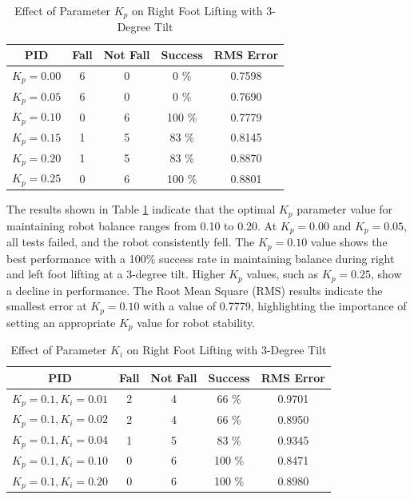 \begin{enumerate}[label=\Alph*.]
        \begin{table}[h]
            \centering
            \caption{Effect of Parameter $K_p$ on Right Foot Lifting with 3-Degree Tilt}
            \begin{tabular}{|c|c|c|c|c|}
                \hline
                \textbf{PID} & \textbf{Fall} & \textbf{Not Fall} & \textbf{Success} & RMS Error \\
                \hline
                $K_p = 0.00$ & 6 & 0 & 0   \% & 0.7598 \\
                $K_p = 0.05$ & 6 & 0 & 0   \% & 0.7690 \\
                $K_p = 0.10$ & 0 & 6 & 100 \% & 0.7779 \\
                $K_p = 0.15$ & 1 & 5 & 83  \% & 0.8145 \\
                $K_p = 0.20$ & 1 & 5 & 83  \% & 0.8870 \\
                $K_p = 0.25$ & 0 & 6 & 100 \% & 0.8801 \\
                \hline
            \end{tabular}
            \label{tab:testing_p}
        \end{table}

    \hspace*{1em} The results shown in Table \ref{tab:testing_p} indicate that the optimal $K_p$ parameter value for maintaining robot balance ranges from 0.10 to 0.20. At $K_p = 0.00$ and $K_p = 0.05$, all tests failed, and the robot consistently fell. The $K_p = 0.10$ value shows the best performance with a 100\% success rate in maintaining balance during right and left foot lifting at a 3-degree tilt. Higher $K_p$ values, such as $K_p = 0.25$, show a decline in performance. The Root Mean Square (RMS) results indicate the smallest error at $K_p = 0.10$ with a value of 0.7779, highlighting the importance of setting an appropriate $K_p$ value for robot stability.

    \begin{table}[h]
        \centering
        \caption{Effect of Parameter $K_i$ on Right Foot Lifting with 3-Degree Tilt}
        \begin{tabular}{|c|c|c|c|c|}
            \hline
            \textbf{PID} & \textbf{Fall} & \textbf{Not Fall} & \textbf{Success} & RMS Error \\
            \hline
            $K_p = 0.1, K_i = 0.01$ & 2 & 4 & 66 \%  & 0.9701\\
            $K_p = 0.1, K_i = 0.02$ & 2 & 4 & 66 \%  & 0.8950\\
            $K_p = 0.1, K_i = 0.04$ & 1 & 5 & 83 \%  & 0.9345\\
            $K_p = 0.1, K_i = 0.10$ & 0 & 6 & 100 \% & 0.8471\\
            $K_p = 0.1, K_i = 0.20$ & 0 & 6 & 100 \% & 0.8980\\           
            \hline
        \end{tabular}
        \label{tab:testing_pi}
    \end{table}


\end{enumerate}

